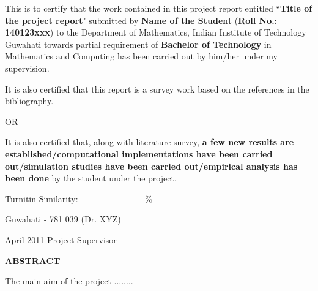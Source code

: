 \documentclass[12pt,a4wide]{report}
\theoremstyle{plain}
\theoremstyle{definition}
\theoremstyle{remark}
\begin{document}
\noindent
This is to certify that the work contained in this project report
entitled ``{\bf Title of the project report}" submitted
by {\bf Name of the Student} ({\bf Roll No.: 140123xxx}) to the Department of Mathematics, Indian Institute of Technology Guwahati
towards partial requirement of {\bf Bachelor of Technology} in Mathematics and Computing  has been carried out
by him/her under my supervision.

\vspace{0.5cm}
\noindent
It is also certified that this report is a survey work based on the references in the bibliography.

\vspace{0.5cm}
OR
\vspace{0.5cm}

\noindent
It is also certified that, along with literature survey, {\bf a few new results are established/computational
implementations have been carried out/simulation studies have been carried out/empirical analysis has been
done} by the student under the project.

\vspace{0.5cm}

\noindent
Turnitin Similarity: \_\_\_\_\_\_\_\_\_\_\%

\vspace{4cm}

\noindent Guwahati - 781 039 \hfill (Dr. XYZ)

\noindent April  2011 \hfill Project Supervisor

\clearpage

\begin{center}
{\Large{\bf{ABSTRACT}}}
\end{center}


The main aim of the project ........

\clearpage



\tableofcontents
\clearpage
\listoffigures
\listoftables


\newpage

\setcounter{page}{1}









\nocite{golub} \nocite{gerla}\nocite{m1}\nocite{chang}



\end{document}
